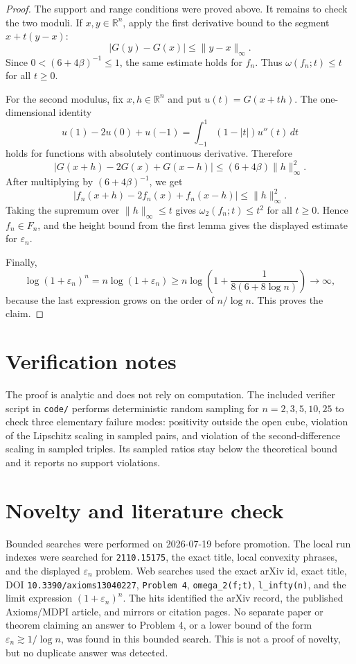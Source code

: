 \documentclass[11pt]{article}
\begin{document}
\begin{proof}
The support and range conditions were proved above.  It remains to check the
two moduli.  If $x,y\in\mathbb R^n$, apply the first derivative bound to the
segment $x+t(y-x)$:
\[
        |G(y)-G(x)|\le \|y-x\|_\infty.
\]
Since $0<(6+4\beta)^{-1}\le1$, the same estimate holds for $f_n$.  Thus
$\omega(f_n;t)\le t$ for all $t\ge0$.

For the second modulus, fix $x,h\in\mathbb R^n$ and put
$u(t)=G(x+th)$.  The one-dimensional identity
\[
        u(1)-2u(0)+u(-1)
        =\int_{-1}^{1}(1-|t|)u''(t)\,dt
\]
holds for functions with absolutely continuous derivative.  Therefore
\[
        |G(x+h)-2G(x)+G(x-h)|
        \le (6+4\beta)\|h\|_\infty^2.
\]
After multiplying by $(6+4\beta)^{-1}$, we get
\[
        |f_n(x+h)-2f_n(x)+f_n(x-h)|
        \le \|h\|_\infty^2.
\]
Taking the supremum over $\|h\|_\infty\le t$ gives
$\omega_2(f_n;t)\le t^2$ for all $t\ge0$.  Hence $f_n\in F_n$, and the height
bound from the first lemma gives the displayed estimate for $\varepsilon_n$.

Finally,
\[
        \log(1+\varepsilon_n)^n
        =n\log(1+\varepsilon_n)
        \ge
        n\log\left(1+\frac{1}{8(6+8\log n)}\right)
        \longrightarrow\infty,
\]
because the last expression grows on the order of $n/\log n$.  This proves the
claim.
\end{proof}

\section{Verification notes}

The proof is analytic and does not rely on computation.  The included verifier
script in \texttt{code/} performs deterministic random sampling
for $n=2,3,5,10,25$ to check three elementary failure modes: positivity outside
the open cube, violation of the Lipschitz scaling in sampled pairs, and
violation of the second-difference scaling in sampled triples.  Its sampled
ratios stay below the theoretical bound and it reports no support violations.

\section{Novelty and literature check}

Bounded searches were performed on 2026-07-19 before promotion.  The local run
indexes were searched for \texttt{2110.15175}, the exact title, local convexity
phrases, and the displayed $\varepsilon_n$ problem.  Web searches used the
exact arXiv id, exact title, DOI \texttt{10.3390/axioms13040227},
\texttt{Problem 4}, \texttt{omega\_2(f;t)}, \texttt{l\_infty(n)}, and the
limit expression $(1+\varepsilon_n)^n$.  The hits identified the arXiv record,
the published Axioms/MDPI article, and mirrors or citation pages.  No separate
paper or theorem claiming an answer to Problem 4, or a lower bound of the form
$\varepsilon_n\gtrsim1/\log n$, was found in this bounded search.  This is not
a proof of novelty, but no duplicate answer was detected.
\end{document}
